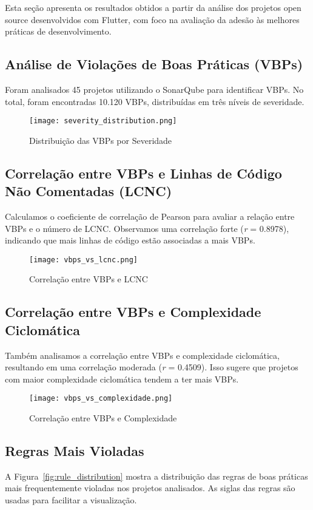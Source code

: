 \documentclass[12pt]{article}
\begin{document}
Esta seção apresenta os resultados obtidos a partir da análise dos projetos open source desenvolvidos com Flutter, com foco na avaliação da adesão às melhores práticas de desenvolvimento.

\subsection{Análise de Violações de Boas Práticas (VBPs)}
Foram analisados 45 projetos utilizando o SonarQube para identificar VBPs. No total, foram encontradas 10.120 VBPs, distribuídas em três níveis de severidade.

\begin{figure}[H]
\centering
\texttt{[image: severity\_distribution.png]}
\caption{Distribuição das VBPs por Severidade}
\label{fig:vbps_severity_distribution}
\end{figure}

\subsection{Correlação entre VBPs e Linhas de Código Não Comentadas (LCNC)}
Calculamos o coeficiente de correlação de Pearson para avaliar a relação entre VBPs e o número de LCNC. Observamos uma correlação forte (\textit{r} = 0.8978), indicando que mais linhas de código estão associadas a mais VBPs.

\begin{figure}[H]
\centering
\texttt{[image: vbps\_vs\_lcnc.png]}
\caption{Correlação entre VBPs e LCNC}
\label{fig:vbps_vs_lcnc}
\end{figure}

\subsection{Correlação entre VBPs e Complexidade Ciclomática}
Também analisamos a correlação entre VBPs e complexidade ciclomática, resultando em uma correlação moderada (\textit{r} = 0.4509). Isso sugere que projetos com maior complexidade ciclomática tendem a ter mais VBPs.
\begin{figure}[H]
\centering
\texttt{[image: vbps\_vs\_complexidade.png]}
\caption{Correlação entre VBPs e Complexidade}
\label{fig:vbps_vs_complexidade}
\end{figure}

\subsection{Regras Mais Violadas}
A Figura~\ref{fig:rule_distribution} mostra a distribuição das regras de boas práticas mais frequentemente violadas nos projetos analisados. As siglas das regras são usadas para facilitar a visualização.
\end{document}
